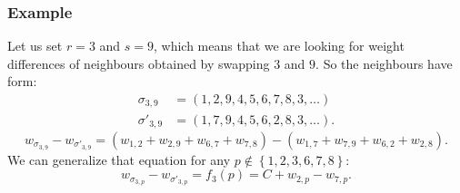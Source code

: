 \begin{frame}
	\frametitle{Example}
	Let us set $r=3$ and $s=9$, which means that we are looking for weight differences of neighbours obtained by swapping $3$ and $9$. So the neighbours have form:
	\begin{align*}
	\sigma_{3,9} &= (1, 2, 9, 4, 5, 6, 7, 8, 3, \ldots) \\
	\sigma'_{3,9} &= (1, 7, 9, 4, 5, 6, 2, 8, 3, \ldots).
	\end{align*}
	\begin{equation*}
	w_{\sigma_{3,9}} - w_{\sigma'_{3,9}} = (w_{1,2} + w_{2,9} + w_{6,7} + w_{7,8}) - (w_{1,7} + w_{7,9} + w_{6,2} + w_{2,8}).
	\end{equation*}
	We can generalize that equation for any $p \notin \left\{ 1,2,3,6,7,8 \right\}$:
	\begin{equation*}
	w_{\sigma_{3,p}} - w_{\sigma'_{3,p}} = f_3(p) = C + w_{2,p} - w_{7,p}.
	\end{equation*}
\end{frame}